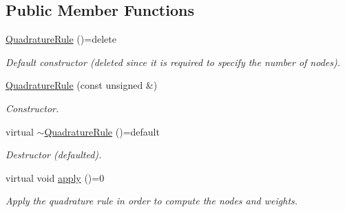 \subsection*{Public Member Functions}
\begin{DoxyCompactItemize}
\item 
\hypertarget{classQuadratureRule_ac7fb9aaf8e3f9eae03235f68a935880a}{\hyperlink{classQuadratureRule_ac7fb9aaf8e3f9eae03235f68a935880a}{Quadrature\-Rule} ()=delete}\label{classQuadratureRule_ac7fb9aaf8e3f9eae03235f68a935880a}

\begin{DoxyCompactList}\small\item\em Default constructor (deleted since it is required to specify the number of nodes). \end{DoxyCompactList}\item 
\hyperlink{classQuadratureRule_a376dee153044df24015711c9a8411bae}{Quadrature\-Rule} (const unsigned \&)
\begin{DoxyCompactList}\small\item\em Constructor. \end{DoxyCompactList}\item 
\hypertarget{classQuadratureRule_a80e11fbb08b332f2d4c56740cb63ac4e}{virtual \hyperlink{classQuadratureRule_a80e11fbb08b332f2d4c56740cb63ac4e}{$\sim$\-Quadrature\-Rule} ()=default}\label{classQuadratureRule_a80e11fbb08b332f2d4c56740cb63ac4e}

\begin{DoxyCompactList}\small\item\em Destructor (defaulted). \end{DoxyCompactList}\item 
\hypertarget{classQuadratureRule_ae8035f1283a63c55fbbfb4e786db8a98}{virtual void \hyperlink{classQuadratureRule_ae8035f1283a63c55fbbfb4e786db8a98}{apply} ()=0}\label{classQuadratureRule_ae8035f1283a63c55fbbfb4e786db8a98}

\begin{DoxyCompactList}\small\item\em Apply the quadrature rule in order to compute the nodes and weights. \end{DoxyCompactList}\end{DoxyCompactItemize}
